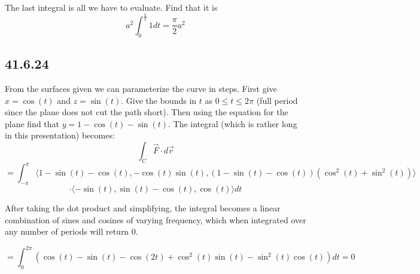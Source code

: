 \documentclass{article}
\begin{document}
The last integral is all we have to evaluate. Find that it is $$a^2\int_0^{\frac{\pi}{2}}1dt = \frac{\pi}{2}a^2$$

\subsection{41.6.24}

From the surfaces given we can parameterize the curve in steps. First give $x=\cos(t)$ and $z=\sin(t)$. Give the bounds in $t$ as $0 \leq t\leq 2\pi$ (full period since the plane does not cut the path short). Then using the equation for the plane find that $y=1-\cos(t)-\sin(t)$. The integral (which is rather long in this presentation) becomes:
$$\int_C \vec{F}\cdot d\vec{r}$$
$$ = \int_{-\pi}^{\pi}\bigg\langle 1-\sin(t)-\cos(t), -\cos(t)\sin(t) ,(1-\sin(t)-\cos(t))(\cos^2(t) + \sin^2(t)) \bigg\rangle$$
$$ \cdot \langle -\sin(t), \sin(t)-\cos(t),\cos(t) \rangle dt$$

After taking the dot product and simplifying, the integral becomes a linear combination of sines and cosines of varying frequency, which when integrated over any number of periods will return $0$.

$$= \int_0^{2\pi}(\cos(t)-\sin(t)-\cos(2t) + \cos^2(t)\sin(t) - \sin^2(t)\cos(t))dt = 0$$
\end{document}
